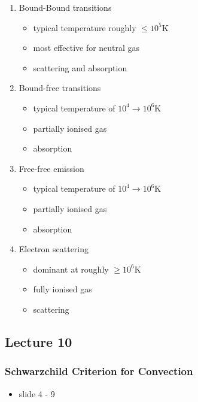 \documentclass[a4paper,11pt,normalem]{article}
\begin{document}
\begin{enumerate}
\def\labelenumi{\arabic{enumi}.}
\item
  Bound-Bound transitions

  \begin{itemize}
  \item
    typical temperature roughly \(\leq 10^5\)K
  \item
    most effective for neutral gas
  \item
    scattering and absorption
  \end{itemize}
\item
  Bound-free transitions

  \begin{itemize}
  \item
    typical temperature of \(10^4 \to 10^6\)K
  \item
    partially ionised gas
  \item
    absorption
  \end{itemize}
\item
  Free-free emission

  \begin{itemize}
  \item
    typical temperature of \(10^4 \to 10^6\)K
  \item
    partially ionised gas
  \item
    absorption
  \end{itemize}
\item
  Electron scattering

  \begin{itemize}
  \item
    dominant at roughly \(\geq 10^6\)K
  \item
    fully ionised gas
  \item
    scattering
  \end{itemize}
\end{enumerate}

\subsection{Lecture 10}\label{lecture-10}

\subsubsection{Schwarzchild Criterion for
Convection}\label{schwarzchild-criterion-for-convection}

\begin{itemize}
\item
  slide 4 - 9
\end{itemize}
\end{document}
